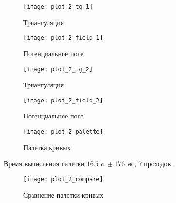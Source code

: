 \begin{figure}[H]
\centering
\texttt{[image: plot\_2\_tg\_1]}
\caption{Триангуляция}
\end{figure}

\begin{figure}[H]
\centering
\texttt{[image: plot\_2\_field\_1]}
\caption{Потенциальное поле}
\end{figure}

\begin{figure}[H]
\texttt{[image: plot\_2\_tg\_2]}
\caption{Триангуляция}
\end{figure}

\begin{figure}[H]
\texttt{[image: plot\_2\_field\_2]}
\caption{Потенциальное поле}
\end{figure}

\begin{figure}[H]
\texttt{[image: plot\_2\_palette]}
\caption{Палетка кривых}
\end{figure}

Время вычисления палетки ${16.5 \text{ c } \pm 176 \text{ мс}}$, 7 проходов.

\begin{figure}[H]
\texttt{[image: plot\_2\_compare]}
\caption{Сравнение палетки кривых}
\end{figure}

\clearpage
